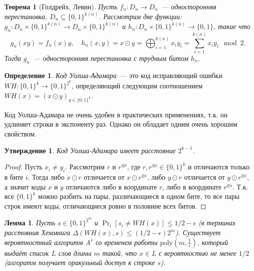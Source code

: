 \documentclass[12pt,a4paper]{article}
\newcommand{\bits}{\{0,1\}}
\newcommand{\poly}{\mathrm{poly}}
\theoremstyle{definition}
\newtheorem{definition}{Определение}[section]
\theoremstyle{plain}
\newtheorem{theorem}{Теорема}[section]
\newtheorem{lemma}{Лемма}[section]
\newtheorem{statement}{Утверждение}[section]
\theoremstyle{remark}
\begin{document}
\begin{theorem}[Голдрейх, Левин]
Пусть $f_n:D_n\to D_n$~--- односторонняя перестановка, $D_n\subseteq \bits^{k(n)}$.
Рассмотрим две функции: $g_n: D_n\times \bits^{k(n)}\to D_n\times \bits^{k(n)}$ и $h_n: D_n\times \bits^{k(n)}\to \bits$, такие что
$$g_n(xy)= f_n(x)y,\quad h_n(x,y) = x\odot y = \bigoplus_{i=1}^{k(n)} x_iy_i = \sum_{i=1}^{k(n)} x_iy_i\mod2.$$ 
Тогда $g_n$~--- односторонняя перестановка
с трудным битом $h_n$.
\end{theorem}

\begin{definition}
\emph{Код Уолша-Адамара}~--- это код исправляющий ошибки $WH: \bits^k\to\bits^{2^k}$,
определяющий следующим соотношением $WH(x)=(x\odot y)_{y\in\bits^{k}}$.
\end{definition}
Код Уолша-Адамара не очень удобен в практических применениях, 
т.к. он удлиняет строки в экспоненту раз.
Однако он обладает одним очень хорошим свойством.
\begin{statement}
Код Уолша-Адамара имеет расстояние $2^{k-1}$.
\end{statement}
\begin{proof}
Пусть $x_i\neq y_i$. Рассмотрим $r$ и $r^{\oplus i}$, где $r,r^{\oplus i}\in\bits^{k}$ и отличаются только в бите $i$.
Тогда либо $x\odot r$ отличается от $x\odot r^{\oplus i}$, либо $y\odot r$ отличается от $y\odot r^{\oplus i}$, а значит коды $x$ и $y$ отличаются либо в координате $r$, либо в координате $r^{\oplus i}$.
Т.к. все $\bits^k$ можно разбить на пары, различающиеся в одном бите, то все пары строк имеют коды, отличающиеся
ровно в половине всех битов.
\end{proof}

\begin{lemma}\label{lm:WH-list-decoding}
Пусть $s\in\bits^{2^m}$ и $\Pr_i[s_i \neq WH(x)] \le 1/2 - \epsilon$ (в терминах расстояния Хеммнига $\Delta(WH(x), s) \le (1/2 - \epsilon)2^m$). Существует вероятностный алгоритм $A^s$ со временем работы $\poly(m, \frac{1}{\epsilon})$, который выдаёт
список $L$ слов длины $m$ такой, что $x\in L$ с вероятностью не менее $1/2$ (алгоритм получает оракульный доступ к строке $s$).
\end{lemma}
\end{document}
